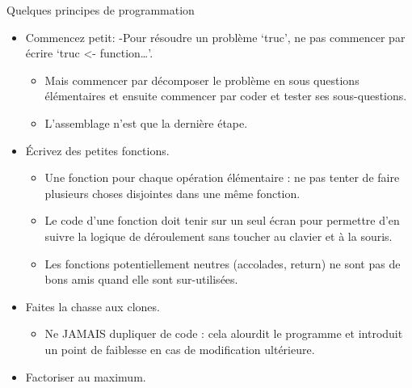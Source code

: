 \documentclass[
  ignorenonframetext,
]{beamer}
\providecommand{\tightlist}{%
  \setlength{\itemsep}{0pt}\setlength{\parskip}{0pt}}
\begin{document}
\begin{frame}{Quelques principes de programmation}
\protect\hypertarget{quelques-principes-de-programmation}{}
\begin{itemize}
\tightlist
\item
  Commencez petit: -Pour résoudre un problème `truc', ne pas commencer
  par écrire `truc \textless- function\ldots{}'.

  \begin{itemize}
  \tightlist
  \item
    Mais commencer par décomposer le problème en sous questions
    élémentaires et ensuite commencer par coder et tester ses
    sous-questions.
  \item
    L'assemblage n'est que la dernière étape.
  \end{itemize}
\item
  Écrivez des petites fonctions.

  \begin{itemize}
  \tightlist
  \item
    Une fonction pour chaque opération élémentaire : ne pas tenter de
    faire plusieurs choses disjointes dans une même fonction.
  \item
    Le code d'une fonction doit tenir sur un seul écran pour permettre
    d'en suivre la logique de déroulement sans toucher au clavier et à
    la souris.
  \item
    Les fonctions potentiellement neutres (accolades, return) ne sont
    pas de bons amis quand elle sont sur-utilisées.
  \end{itemize}
\item
  Faites la chasse aux clones.

  \begin{itemize}
  \tightlist
  \item
    Ne JAMAIS dupliquer de code : cela alourdit le programme et
    introduit un point de faiblesse en cas de modification ultérieure.\\
  \end{itemize}
\item
  Factoriser au maximum.


\end{itemize}
\end{frame}
\end{document}
